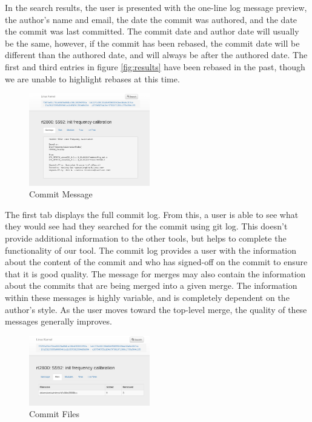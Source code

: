 \documentclass[conference, draftclsnofoot]{IEEEtran}
\begin{document}
In the search results, the user is presented with the one-line log message
preview, the author's name and email, the date the commit was authored, and the
date the commit was last committed.  The commit date and author date will
usually be the same, however, if the commit has been rebased, the commit date
will be different than the authored date, and will always be after the authored
date. The first and third entries in figure \ref{fig:results} have been rebased
in the past, though we are unable to highlight rebases at this time.

\begin{figure}[h]
	\centering
	\includegraphics[width=0.47\textwidth]{figures/message_view.png}
	\caption{Commit Message}
	\label{fig:message}
\end{figure}

The first tab displays the full commit log. From this, a user is able to see
what they would see had they searched for the commit using git log. This
doesn't provide additional information to the other tools, but helps to
complete the functionality of our tool. The commit log provides a user with
the information about the content of the commit and who has signed-off on the
commit to ensure that it is good quality. The message for merges may also
contain the information about the commits that are being merged into a given
merge. The information within these messages is highly variable, and is
completely dependent on the author's style. As the user moves toward the
top-level merge, the quality of these messages generally improves.

\begin{figure}[h]
	\centering
	\includegraphics[width=0.47\textwidth]{figures/file_view.png}
	\caption{Commit Files}
	\label{fig:files}
\end{figure}
\end{document}
